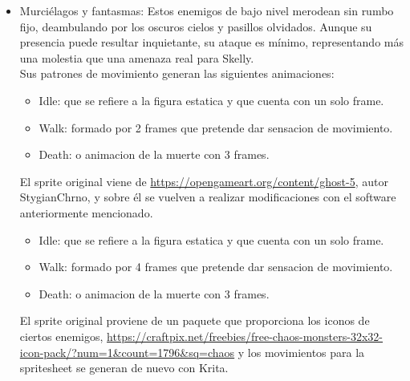 \documentclass[12pt,a4paper,twoside,spanish]{article}      %
\begin{document}
\begin{itemize}

    \item Murciélagos y fantasmas: Estos enemigos de bajo nivel merodean sin rumbo fijo, deambulando por los oscuros cielos y pasillos olvidados. Aunque su presencia puede resultar inquietante, su ataque es mínimo, representando más una molestia que una amenaza real para Skelly.\\
    Sus patrones de movimiento generan las siguientes animaciones:
    \begin{itemize}
        \item Idle: que se refiere a la figura estatica y que cuenta con un solo frame.
        \item Walk: formado por 2 frames que pretende dar sensacion de movimiento.
        \item Death: o animacion de la muerte con 3 frames.
    \end{itemize}
    El sprite original viene de \url{https://opengameart.org/content/ghost-5}, autor StygianChrno, y sobre él se vuelven a realizar modificaciones con el software anteriormente mencionado.

    \begin{center}
    \end{center}
    \begin{itemize}
        \item Idle: que se refiere a la figura estatica y que cuenta con un solo frame.
        \item Walk: formado por 4 frames que pretende dar sensacion de movimiento.
        \item Death: o animacion de la muerte con 3 frames.
    \end{itemize}
    El sprite original proviene de un paquete que proporciona los iconos de ciertos enemigos, \url{https://craftpix.net/freebies/free-chaos-monsters-32x32-icon-pack/?num=1&count=1796&sq=chaos} y los movimientos para la spritesheet se generan de nuevo con Krita.

    \begin{center}
    \end{center}


\end{itemize}
\end{document}
